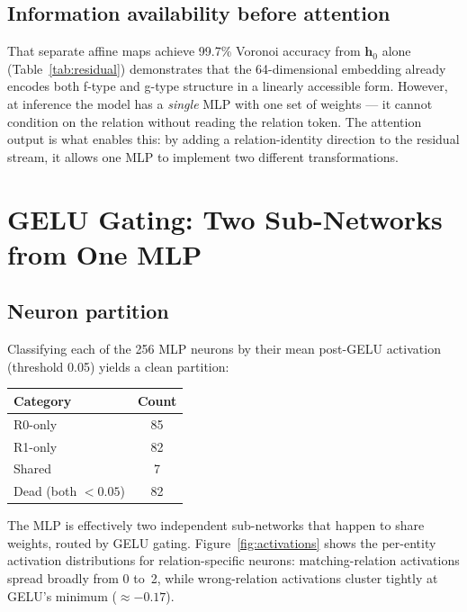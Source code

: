\documentclass[11pt,a4paper]{article}
\newcommand{\bh}{\mathbf{h}}
\begin{document}
\subsection{Information availability before attention}
\label{sec:h0_info}

That separate affine maps achieve 99.7\% Voronoi accuracy from $\bh_0$
alone (Table~\ref{tab:residual}) demonstrates that the 64-dimensional
embedding already encodes both f-type and g-type structure in a
linearly accessible form. However, at inference the model has a
\emph{single} MLP with one set of weights --- it cannot condition on
the relation without reading the relation token. The attention output
is what enables this: by adding a relation-identity direction to the
residual stream, it allows one MLP to implement two different
transformations.

\section{GELU Gating: Two Sub-Networks from One MLP}
\label{sec:gelu_gating}

\subsection{Neuron partition}
\label{sec:partition}

Classifying each of the 256 MLP neurons by their mean post-GELU
activation (threshold 0.05) yields a clean partition:
\begin{center}
\begin{tabular}{lc}
\toprule
Category & Count \\
\midrule
R0-only & 85 \\
R1-only & 82 \\
Shared & 7 \\
Dead (both $< 0.05$) & 82 \\
\bottomrule
\end{tabular}
\end{center}
The MLP is effectively two independent sub-networks that happen to
share weights, routed by GELU gating. Figure~\ref{fig:activations}
shows the per-entity activation distributions for relation-specific
neurons: matching-relation activations spread broadly from 0 to~2,
while wrong-relation activations cluster tightly at GELU's minimum
($\approx -0.17$).
\end{document}
